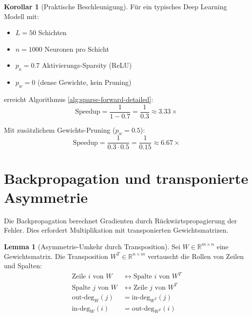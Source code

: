 \documentclass[a4paper,12pt]{report}
\theoremstyle{definition}
\newtheorem{lemma}{Lemma}
\newtheorem{korollar}{Korollar}
\begin{document}
	\begin{korollar}[Praktische Beschleunigung]
		Für ein typisches Deep Learning Modell mit:
		\begin{itemize}
			\item $L = 50$ Schichten
			\item $n = 1000$ Neuronen pro Schicht
			\item $p_a = 0.7$ Aktivierungs-Sparsity (ReLU)
			\item $p_w = 0$ (dense Gewichte, kein Pruning)
		\end{itemize}
		
		erreicht Algorithmus \ref{alg:sparse-forward-detailed}:
		\[
		\text{Speedup} = \frac{1}{1-0.7} = \frac{1}{0.3} \approx 3.33\times
		\]
		
		Mit zusätzlichem Gewichts-Pruning ($p_w = 0.5$):
		\[
		\text{Speedup} = \frac{1}{0.3 \cdot 0.5} = \frac{1}{0.15} \approx 6.67\times
		\]
	\end{korollar}
	
	\section{Backpropagation und transponierte Asymmetrie}
	
	Die Backpropagation berechnet Gradienten durch Rückwärtspropagierung der Fehler. Dies erfordert Multiplikation mit transponierten Gewichtsmatrizen.
	
	\begin{lemma}[Asymmetrie-Umkehr durch Transposition]
		Sei $W \in \mathbb{R}^{m \times n}$ eine Gewichtsmatrix. Die Transposition $W^T \in \mathbb{R}^{n \times m}$ vertauscht die Rollen von Zeilen und Spalten:
		\begin{align}
			\text{Zeile } i \text{ von } W &\leftrightarrow \text{Spalte } i \text{ von } W^T \\
			\text{Spalte } j \text{ von } W &\leftrightarrow \text{Zeile } j \text{ von } W^T \\
			\text{out-deg}_W(j) &= \text{in-deg}_{W^T}(j) \\
			\text{in-deg}_W(i) &= \text{out-deg}_{W^T}(i)
		\end{align}
	\end{lemma}
	
\end{document}
